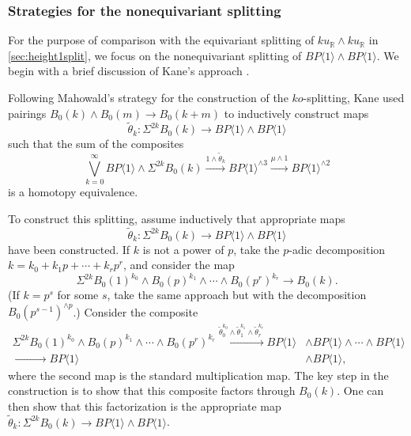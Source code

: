 \documentclass{amsart}
\theoremstyle{plain}
\numberwithin{equation}{section}
\numberwithin{figure}{section}
\newcommand{\mR}{{\mathbb R}}
\newcommand{\0}{\langle 0 \rangle }
\newcommand{\one}{\langle 1 \rangle }
\begin{document}
\subsubsection{Strategies for the nonequivariant splitting} For the purpose of comparison with the equivariant splitting of $ku_\mR \wedge ku_\mR$ in \cref{sec:height1split}, we focus on the nonequivariant splitting of $BP \langle 1 \rangle \wedge BP \langle 1 \rangle.$ We begin with a brief discussion of Kane's approach \cite{kane1981operations}. 

Following Mahowald's strategy for the construction of the $ko$-splitting, Kane used pairings $B_{0}(k) \wedge B_{0}(m) \to B_{0}(k+m)$ to inductively construct maps
\[\tilde{\theta}_{k}: \Sigma^{2k} B_{0}(k) \to BP\one \wedge BP\one \]
such that the sum of the composites
\[ 
\bigvee\limits_{k=0}^{\infty} BP\one \wedge \Sigma^{2k} B_{0}(k) \xrightarrow{1 \wedge \tilde{\theta}_{k}}  BP\one^{\wedge 3} \xrightarrow{\mu \wedge 1} BP\one^{\wedge 2} 
\] is a homotopy equivalence. 

To construct this splitting, assume inductively that appropriate maps 
\[
\tilde{\theta}_{k}: \Sigma^{2k}B_{0}(k) \to BP\one \wedge BP\one
\]
have been constructed. If $k$ is not a power of $p$, take the $p$-adic decomposition $k = k_{0} + k_{1}p + \cdots + k_{r}p^{r}$, and consider the map
\[\Sigma^{2k} B_{0}(1)^{k_{0}} \wedge B_{0}(p)^{k_{1}} \wedge \cdots \wedge B_{0}(p^{r})^{k_{r}} \to B_{0}(k). \]
 (If $k = p ^{s}$ for some $s$, take the same approach but with the decomposition $B_0(p^{s-1})^{\wedge p}$.) Consider the composite
\begin{align*}
    \Sigma^{2k} B_{0}(1)^{k_{0}} \wedge B_{0}(p)^{k_{1}} \wedge \cdots \wedge B_{0}(p^{r})^{k_{r}}  \xrightarrow{\tilde{\theta}_{0}^{k_{0}} \wedge \tilde{\theta}_{1}^{k_{1}} \wedge \tilde{\theta}_{r}^{k_{r}}}  BP\one & \wedge BP\one \wedge  \cdots \wedge BP\one  \\ \xrightarrow{\qquad \qquad} BP\one & \wedge BP\one,
\end{align*}
where the second map is the standard multiplication map. The key step in the construction is to show that this composite factors through $B_{0}(k)$. One can then show that this factorization is the appropriate map $\tilde{\theta}_k: \Sigma^{2k}  B_{0}(k) \to BP\one \wedge BP\one$.
\end{document}
